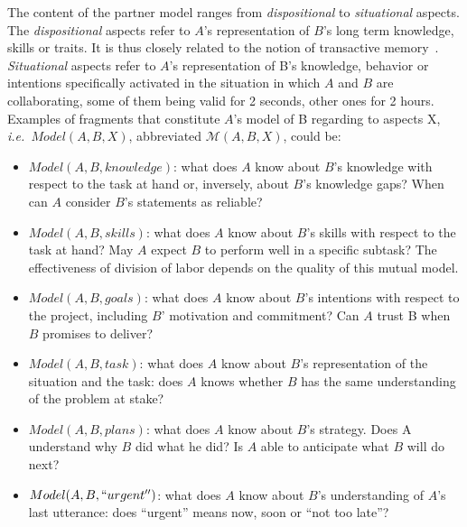 \documentclass[natbib]{svjour3}
\newcommand{\ie}{{\textit{i.e.\ }}}
\newcommand{\model}[3]{{$\mathcal{M}(#1, #2, #3)$}}
\begin{document}
The content of the partner model ranges from \emph{dispositional} to
\emph{situational} aspects. The \emph{dispositional} aspects refer to $A$'s
representation of $B$'s long term knowledge, skills or traits. It is thus closely
related to the notion of transactive memory~\citep{wegner1987transactive,
moreland1999transactive}.  \emph{Situational} aspects refer to $A$'s representation of
B's knowledge, behavior or intentions specifically activated in the situation in
which $A$ and $B$ are collaborating, some of them being valid for 2 seconds, other
ones for 2 hours. Examples of fragments that constitute $A$'s model of B
regarding to aspects X, \ie $Model(A,B,X)$, abbreviated \model{A}{B}{X}, could be:

\begin{itemize}

    \item $Model(A,B, knowledge)$: what does $A$ know about $B$'s knowledge with
        respect to the task at hand or, inversely, about $B$'s knowledge gaps?
        When can $A$ consider $B$'s statements as reliable? 

    \item $Model(A,B, skills)$: what does $A$ know about $B$'s skills with respect to
        the task at hand? May $A$ expect $B$ to perform well in a specific subtask?
        The effectiveness of division of labor depends on the quality of this
        mutual model. 

    \item $Model(A,B, goals)$: what does $A$ know about $B$'s intentions with respect
        to the project, including $B$' motivation and commitment? Can $A$ trust B
        when $B$ promises to deliver? 

    \item $Model(A,B, task)$: what does $A$ know about $B$'s representation of the
        situation and the task: does $A$ knows whether $B$ has the same
        understanding of the problem at stake? 

    \item $Model(A,B, plans)$: what does $A$ know about $B$'s strategy. Does A
        understand why $B$ did what he did? Is $A$ able to anticipate what $B$ will do
        next? 

    \item $Model(A,B, ``urgent'')$: what does $A$ know about $B$'s understanding of $A$'s
        last utterance: does ``urgent'' means now, soon or ``not too late''?

\end{itemize}
\end{document}
